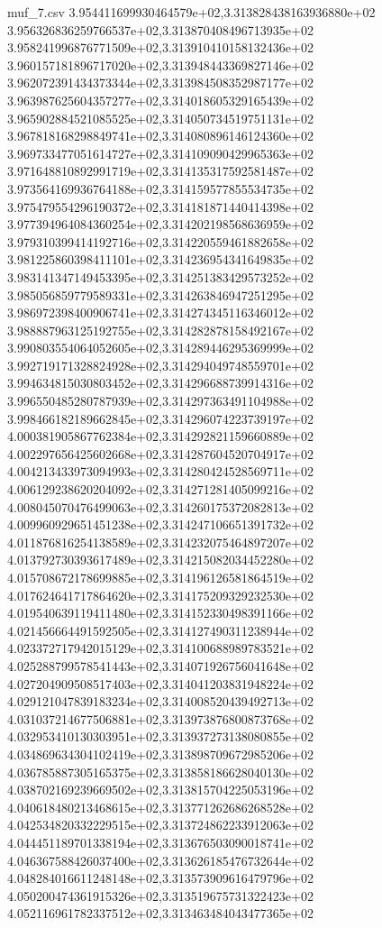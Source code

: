 \begin{filecontents*}{muf_7.csv}
3.954411699930464579e+02,3.313828438163936880e+02
3.956326836259766537e+02,3.313870408496713935e+02
3.958241996876771509e+02,3.313910410158132436e+02
3.960157181896717020e+02,3.313948443369827146e+02
3.962072391434373344e+02,3.313984508352987177e+02
3.963987625604357277e+02,3.314018605329165439e+02
3.965902884521085525e+02,3.314050734519751131e+02
3.967818168298849741e+02,3.314080896146124360e+02
3.969733477051614727e+02,3.314109090429965363e+02
3.971648810892991719e+02,3.314135317592581487e+02
3.973564169936764188e+02,3.314159577855534735e+02
3.975479554296190372e+02,3.314181871440414398e+02
3.977394964084360254e+02,3.314202198568636959e+02
3.979310399414192716e+02,3.314220559461882658e+02
3.981225860398411101e+02,3.314236954341649835e+02
3.983141347149453395e+02,3.314251383429573252e+02
3.985056859779589331e+02,3.314263846947251295e+02
3.986972398400906741e+02,3.314274345116346012e+02
3.988887963125192755e+02,3.314282878158492167e+02
3.990803554064052605e+02,3.314289446295369999e+02
3.992719171328824928e+02,3.314294049748559701e+02
3.994634815030803452e+02,3.314296688739914316e+02
3.996550485280787939e+02,3.314297363491104988e+02
3.998466182189662845e+02,3.314296074223739197e+02
4.000381905867762384e+02,3.314292821159660889e+02
4.002297656425602668e+02,3.314287604520704917e+02
4.004213433973094993e+02,3.314280424528569711e+02
4.006129238620204092e+02,3.314271281405099216e+02
4.008045070476499063e+02,3.314260175372082813e+02
4.009960929651451238e+02,3.314247106651391732e+02
4.011876816254138589e+02,3.314232075464897207e+02
4.013792730393617489e+02,3.314215082034452280e+02
4.015708672178699885e+02,3.314196126581864519e+02
4.017624641717864620e+02,3.314175209329232530e+02
4.019540639119411480e+02,3.314152330498391166e+02
4.021456664491592505e+02,3.314127490311238944e+02
4.023372717942015129e+02,3.314100688989783521e+02
4.025288799578541443e+02,3.314071926756041648e+02
4.027204909508517403e+02,3.314041203831948224e+02
4.029121047839183234e+02,3.314008520439492713e+02
4.031037214677506881e+02,3.313973876800873768e+02
4.032953410130303951e+02,3.313937273138080855e+02
4.034869634304102419e+02,3.313898709672985206e+02
4.036785887305165375e+02,3.313858186628040130e+02
4.038702169239669502e+02,3.313815704225053196e+02
4.040618480213468615e+02,3.313771262686268528e+02
4.042534820332229515e+02,3.313724862233912063e+02
4.044451189701338194e+02,3.313676503090018741e+02
4.046367588426037400e+02,3.313626185476732644e+02
4.048284016611248148e+02,3.313573909616479796e+02
4.050200474361915326e+02,3.313519675731322423e+02
4.052116961782337512e+02,3.313463484043477365e+02

\end{filecontents*}
